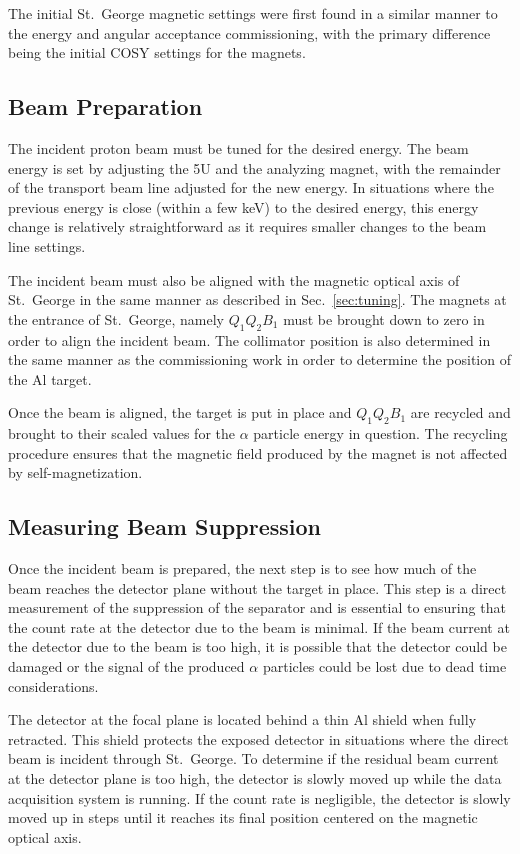 The initial St.\ George magnetic settings were first found in a similar
manner to the energy and angular acceptance commissioning, with the
primary difference being the initial COSY settings for the magnets.

\newpage
\subsection{Beam Preparation}

The incident proton beam must be tuned for the desired energy. The beam
energy is set by adjusting the 5U and the analyzing magnet, with the
remainder of the transport beam line adjusted for the new energy. In
situations where the previous energy is close (within a few keV) to the
desired energy, this energy change is relatively straightforward as it
requires smaller changes to the beam line settings.

The incident beam must also be aligned with the magnetic optical axis of
St.\ George in the same manner as described in Sec.~\ref{sec:tuning}.
The magnets at the entrance of St.\ George, namely $Q_1Q_2B_1$ must be
brought down to zero in order to align the incident beam. The collimator
position is also determined in the same manner as the commissioning work
in order to determine the position of the Al target.

Once the beam is aligned, the target is put in place and $Q_1Q_2B_1$ are
recycled and brought to their scaled values for the $\alpha$ particle
energy in question. The recycling procedure ensures that the magnetic
field produced by the magnet is not affected by self-magnetization.

\subsection{Measuring Beam Suppression}

Once the incident beam is prepared, the next step is to see how much of
the beam reaches the detector plane without the target in place. This
step is a direct measurement of the suppression of the separator and is
essential to ensuring that the count rate at the detector due to the
beam is minimal. If the beam current at the detector due to the beam is
too high, it is possible that the detector could be damaged or the
signal of the produced $\alpha$ particles could be lost due to dead time
considerations.

The detector at the focal plane is located behind a thin Al shield when
fully retracted. This shield protects the exposed detector in situations
where the direct beam is incident through St.\ George. To determine if
the residual beam current at the detector plane is too high, the
detector is slowly moved up while the data acquisition system is
running. If the count rate is negligible, the detector is slowly moved
up in steps until it reaches its final position centered on the magnetic
optical axis.

